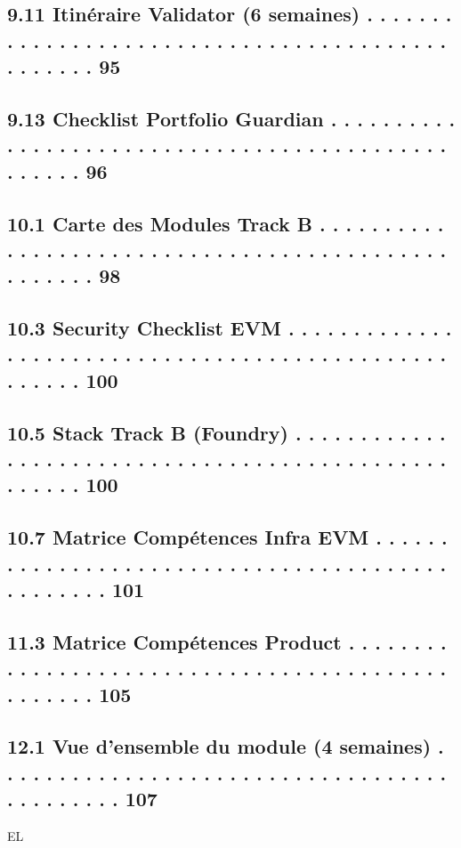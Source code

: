 \subsection{9.11 Itinéraire Validator (6 semaines) . . . . . . . . . . . . . . . . . . . . . . . . . . . . . . . . . . . . . . . . . . . . . . . .    95}
\subsection{9.13 Checklist Portfolio Guardian . . . . . . . . . . . . . . . . . . . . . . . . . . . . . . . . . . . . . . . . . . . . . . . . . .     96}
\vspace{0.5em}
\subsection{10.1 Carte des Modules Track B . . . . . . . . . . . . . . . . . . . . . . . . . . . . . . . . . . . . . . . . . . . . . . . . . . . 98}
\subsection{10.3 Security Checklist EVM . . . . . . . . . . . . . . . . . . . . . . . . . . . . . . . . . . . . . . . . . . . . . . . . . . . . . 100}
\subsection{10.5 Stack Track B (Foundry) . . . . . . . . . . . . . . . . . . . . . . . . . . . . . . . . . . . . . . . . . . . . . . . . . . . . 100}
\subsection{10.7 Matrice Compétences Infra EVM . . . . . . . . . . . . . . . . . . . . . . . . . . . . . . . . . . . . . . . . . . . . . . . . 101}
\vspace{0.5em}
\subsection{11.3 Matrice Compétences Product . . . . . . . . . . . . . . . . . . . . . . . . . . . . . . . . . . . . . . . . . . . . . . . . . 105}
\vspace{0.5em}
\subsection{12.1 Vue d’ensemble du module (4 semaines) . . . . . . . . . . . . . . . . . . . . . . . . . . . . . . . . . . . . . . . . . . . . 107}
\vspace{0.5em}
\vspace{0.5em}
\vspace{0.5em}
\vspace{0.5em}
EL\\
